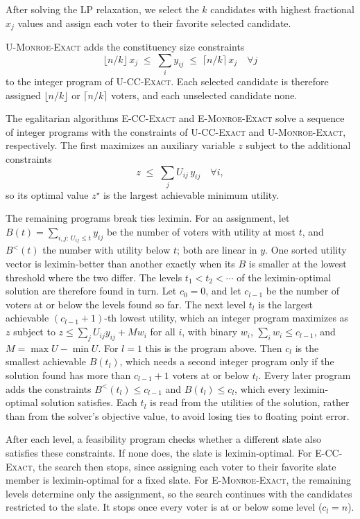 \documentclass[letterpaper]{article} %
\newcommand{\Exact}{\textsc{U-CC-Exact}}
\newcommand{\ExactMonroe}{\textsc{U-Monroe-Exact}}
\newcommand{\EExactMonroe}{\textsc{E-Monroe-Exact}}
\newcommand{\ECCExact}{\textsc{E-CC-Exact}}
\begin{document}
After solving the LP relaxation, we select the \(k\) candidates with highest fractional \(x_j\) values and assign each voter to their favorite selected candidate.

\ExactMonroe{} adds the constituency size constraints
\[
\lfloor n/k\rfloor\, x_j \;\le\; \sum_i y_{ij} \;\le\; \lceil n/k\rceil\, x_j \quad \forall j
\]
to the integer program of \Exact{}.
Each selected candidate is therefore assigned \(\lfloor n/k\rfloor\) or \(\lceil n/k\rceil\) voters, and each unselected candidate none.

The egalitarian algorithms \ECCExact{} and \EExactMonroe{} solve a sequence of integer programs with the constraints of \Exact{} and \ExactMonroe{}, respectively.
The first maximizes an auxiliary variable \(z\) subject to the additional constraints
\[
z \;\le\; \sum_j U_{ij}\, y_{ij} \quad \forall i,
\]
so its optimal value \(z^\star\) is the largest achievable minimum utility.

The remaining programs break ties leximin.
For an assignment, let \(B(t)=\sum_{i,j:\,U_{ij}\le t} y_{ij}\) be the number of voters with utility at most \(t\), and \(B^<(t)\) the number with utility below \(t\); both are linear in \(y\).
One sorted utility vector is leximin-better than another exactly when its \(B\) is smaller at the lowest threshold where the two differ.
The levels \(t_1<t_2<\cdots\) of the leximin-optimal solution are therefore found in turn.
Let \(c_0=0\), and let \(c_{l-1}\) be the number of voters at or below the levels found so far.
The next level \(t_l\) is the largest achievable \((c_{l-1}+1)\)-th lowest utility, which an integer program maximizes as \(z\) subject to \(z\le\sum_j U_{ij}y_{ij}+M w_i\) for all \(i\), with binary \(w_i\), \(\sum_i w_i\le c_{l-1}\), and \(M=\max U-\min U\).
For \(l=1\) this is the program above.
Then \(c_l\) is the smallest achievable \(B(t_l)\), which needs a second integer program only if the solution found has more than \(c_{l-1}+1\) voters at or below \(t_l\).
Every later program adds the constraints \(B^<(t_l)\le c_{l-1}\) and \(B(t_l)\le c_l\), which every leximin-optimal solution satisfies.
Each \(t_l\) is read from the utilities of the solution, rather than from the solver's objective value, to avoid losing ties to floating point error.

After each level, a feasibility program checks whether a different slate also satisfies these constraints.
If none does, the slate is leximin-optimal.
For \ECCExact{}, the search then stops, since assigning each voter to their favorite slate member is leximin-optimal for a fixed slate.
For \EExactMonroe{}, the remaining levels determine only the assignment, so the search continues with the candidates restricted to the slate.
It stops once every voter is at or below some level (\(c_l=n\)).
\end{document}

